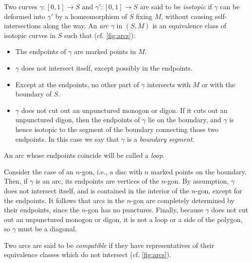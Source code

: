\begin{definition}

	Two curves $\gamma \colon [0,1] \to S$ and $\gamma' \colon [0,1] \to S$ are said to be
	\emph{isotopic} if $\gamma$ can be deformed into $\gamma'$ by a
	homeomorphism of $S$ fixing $M$, without causing self-intersections along the way. An
	\emph{arc} $\gamma$ in $(S, M)$ is an equivalence class of isotopic curves
	in $S$ such that (cf. \cref{fig:arcs}):
	\begin{itemize}
		\item The endpoints of $\gamma$ are marked points in $M$.
		\item $\gamma$ does not intersect itself, except possibly in the endpoints.
		\item Except at the endpoints, no other part of $\gamma$ intersects with $M$ or with the
		      boundary of $S$.
		\item $\gamma$ does not cut out an unpunctured monogon or digon. If it cuts out an unpunctured digon, then the endpoints of $\gamma$ lie on the boundary, and $\gamma$ is hence isotopic to the segment of the boundary connecting those two endpoints. In this case we say that $\gamma$ is a \emph{boundary segment}.
	\end{itemize}
	An arc whose endpoints coincide will be called a \emph{loop}.
\end{definition}

Consider the case of an $n$-gon, i.e., a disc with $n$ marked points on the boundary.
Then, if $\gamma$ is an arc, its endpoints are vertices of the $n$-gon. By assumption,
$\gamma$ does not intersect itself, and is contained in the interior of the $n$-gon,
except for the endpoints. It follows that arcs in the $n$-gon are completely determined
by their endpoints, since the $n$-gon has no punctures. Finally, because $\gamma$ does
not cut out an unpunctured monogon or digon, it is not a loop or a side of the polygon,
so $\gamma$ must be a diagonal.

\begin{definition}

	Two arcs are said to be \emph{compatible} if they have
	representatives of their equivalence classes which do not intersect (cf.
	\cref{fig:arcs}).
\end{definition}

